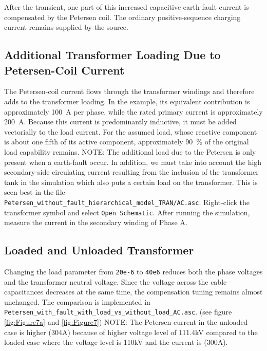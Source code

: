 After the transient, one part of this increased capacitive earth-fault current
is compensated by the Petersen coil. The ordinary positive-sequence charging
current remains supplied by the source.


\subsection{Additional Transformer Loading Due to Petersen-Coil Current}
\label{sec:petersen-transformer-loading}

The Petersen-coil current flows through the transformer windings and therefore
adds to the transformer loading. In the example, its equivalent contribution
is approximately \SI{100}{\ampere} per phase, while the rated primary current
is approximately \SI{200}{\ampere}. Because this current is predominantly
inductive, it must be added vectorially to the load current. For the assumed
load, whose reactive component is about one fifth of its active component,
approximately \SI{90}{\percent} of the original load capability remains.
NOTE: The additional load due to the Petersen is only present when a earth-fault
occur. In addition, we must take into account the high secondary-side circulating current resulting from the inclusion of the transformer tank in the simulation which also puts a  certain load on the transformer.
This is seen best in the file \texttt{Petersen\_without\_fault\_hierarchical\_model\_TRAN/AC.asc}.
Right-click the transformer symbol and select \texttt{Open Schematic}. After running the simulation, measure the current in the secondary winding of Phase A. 

\subsection{Loaded and Unloaded Transformer}
\label{sec:loaded-unloaded-transformer-earth-fault}

Changing the load parameter from \texttt{20e-6} to \texttt{40e6} reduces both
the phase voltages and the transformer neutral voltage. Since the voltage
across the cable capacitances decreases at the same time, the compensation
tuning remains almost unchanged. The comparison is implemented in
\texttt{Petersen\_with\_fault\_with\_load\_vs\_without\_load\_AC.asc}.
(see figure \ref{fig:Figure7a} and \ref{fig:Figure7})
NOTE: The Petersen current in the unloaded case is higher (304A) because of higher voltage level of 111.4kV compared to the loaded case where the voltage level is 110kV and the current is (300A). 

